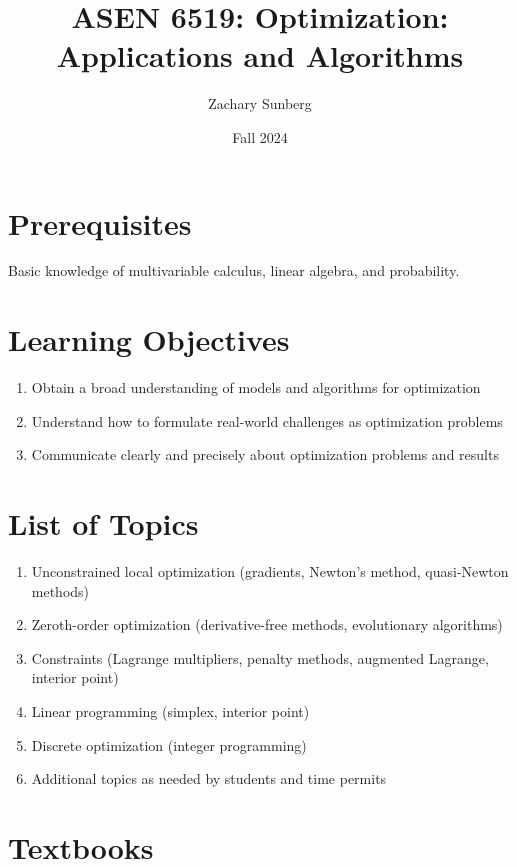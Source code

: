 \documentclass[9pt]{article}
\title{ASEN 6519: Optimization: Applications and Algorithms}
\author{Zachary Sunberg}
\date{Fall 2024}
\begin{document}
\maketitle

\section*{Prerequisites}

Basic knowledge of multivariable calculus, linear algebra, and probability.

\section*{Learning Objectives}

\begin{enumerate}[noitemsep]
    \item Obtain a broad understanding of models and algorithms for optimization
    \item Understand how to formulate real-world challenges as optimization problems
    \item Communicate clearly and precisely about optimization problems and results
\end{enumerate}

\section*{List of Topics}

\begin{enumerate}[noitemsep]
    \item Unconstrained local optimization (gradients, Newton's method, quasi-Newton methods)
    \item Zeroth-order optimization (derivative-free methods, evolutionary algorithms)
    \item Constraints (Lagrange multipliers, penalty methods, augmented Lagrange, interior point)
    \item Linear programming (simplex, interior point)
    \item Discrete optimization (integer programming)
    \item Additional topics as needed by students and time permits
\end{enumerate}

\section*{Textbooks}
\end{document}
